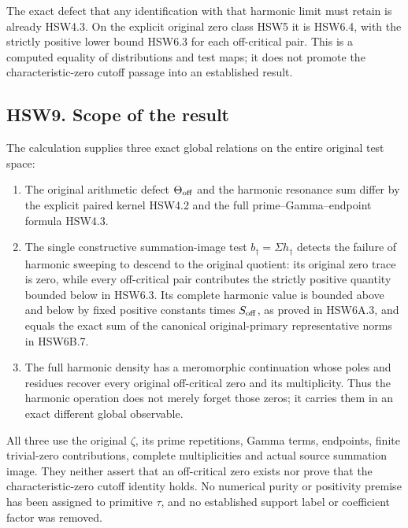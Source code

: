 The exact defect that any identification with that harmonic limit must
retain is already HSW4.3. On the explicit original zero class HSW5 it is
HSW6.4, with the strictly positive lower bound HSW6.3 for each
off-critical pair. This is a computed equality of distributions and test
maps; it does not promote the characteristic-zero cutoff passage into an
established result.

\subsection{HSW9. Scope of the result}\label{hsw9.-scope-of-the-result}

The calculation supplies three exact global relations on the entire
original test space:

\begin{enumerate}
\def\labelenumi{\arabic{enumi}.}
\tightlist
\item
  The original arithmetic defect \(\Theta_{\rm off}\) and the harmonic
  resonance sum differ by the explicit paired kernel HSW4.2 and the full
  prime--Gamma--endpoint formula HSW4.3.
\item
  The single constructive summation-image test
  \(b_\dagger=\Sigma h_\dagger\) detects the failure of harmonic
  sweeping to descend to the original quotient: its original zero trace
  is zero, while every off-critical pair contributes the strictly
  positive quantity bounded below in HSW6.3. Its complete harmonic value
  is bounded above and below by fixed positive constants times
  \(S_{\rm off}\), as proved in HSW6A.3, and equals the exact sum of the
  canonical original-primary representative norms in HSW6B.7.
\item
  The full harmonic density has a meromorphic continuation whose poles
  and residues recover every original off-critical zero and its
  multiplicity. Thus the harmonic operation does not merely forget those
  zeros; it carries them in an exact different global observable.
\end{enumerate}

All three use the original \(\zeta\), its prime repetitions, Gamma
terms, endpoints, finite trivial-zero contributions, complete
multiplicities and actual source summation image. They neither assert
that an off-critical zero exists nor prove that the characteristic-zero
cutoff identity holds. No numerical purity or positivity premise has
been assigned to primitive \(\tau\), and no established support label or
coefficient factor was removed.

